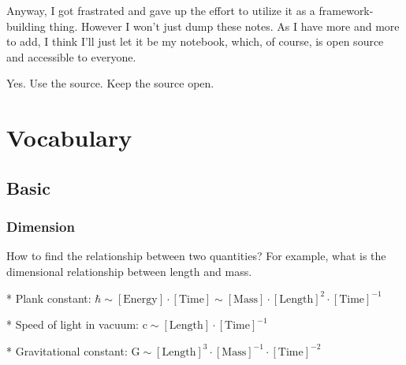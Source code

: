 \documentclass[letterpaper,10pt,english]{sphinxmanual}
\begin{document}
Anyway, I got frastrated and gave up the effort to utilize it as a framework-building thing. However I won't just dump these notes. As I have more and more to add, I think I'll just let it be my notebook, which, of course, is open source and accessible to everyone.

Yes. Use the source. Keep the source open.


\chapter{Vocabulary}
\label{index:vocabulary}

\section{Basic}
\label{Basic::doc}\label{Basic:basic}

\subsection{Dimension}
\label{Basic:dimension}
How to find the relationship between two quantities? For example, what is the dimensional relationship between length and mass.

\begin{DUlineblock}{0em}
\item[] * Plank constant: $\mathrm{ \hbar \sim [Energy]\cdot [Time] \sim [Mass]\cdot [Length]^2 \cdot [Time]^{-1} }$
\item[] * Speed of light in vacuum: $\mathrm{ c\sim [Length]\cdot [Time]^{-1} }$
\item[] * Gravitational constant: $\mathrm{  G \sim [Length]^3\cdot [Mass]^{-1} \cdot [Time]^{-2} }$
\end{DUlineblock}
\end{document}
